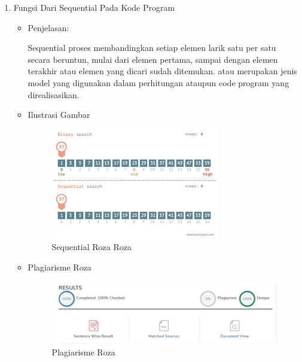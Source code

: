 \begin{enumerate}
\item Fungsi Dari Sequential Pada Kode Program
\begin{itemize}
\item Penjelasan:
\par Sequential proses membandingkan setiap elemen larik satu per satu secara beruntun, mulai dari elemen pertama, sampai dengan elemen terakhir atau elemen yang dicari sudah ditemukan. atau merupakan jenis model yang digunakan dalam perhitungan ataupun code program yang direalisasikan.
\par
\item Ilustrasi Gambar
\begin{figure}[!hbtp]
\centering
\includegraphics[scale=0.8]{figures/sequentialroza.png}
\caption{Sequential Roza Roza}
\label{text-fadila}
\end{figure}
\par
\end{itemize}
\par
\par

\begin{itemize}
\item Plagiarisme Roza
\begin{figure}[!hbtp]
\centering
\includegraphics[scale=0.5]{figures/plagiarisme.jpg}
\caption{Plagiarisme Roza}
\label{text-fadila}
\end{figure}
\end{itemize}

\end{enumerate}










